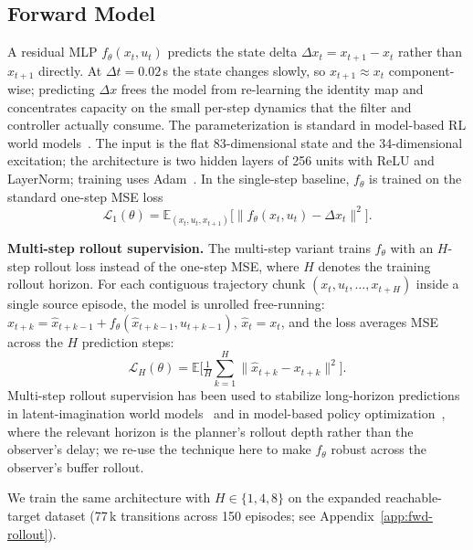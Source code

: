 \documentclass[sn-mathphys,NameDate,iicol]{sn-jnl}
\begin{document}
\subsection{Forward Model}
A residual MLP $f_\theta(x_t, u_t)$ predicts the state delta
$\Delta x_t {=} x_{t+1}-x_t$ rather than $x_{t+1}$ directly. At
$\Delta t{=}0.02$\,s the state changes slowly, so $x_{t+1}\!\approx\!x_t$
component-wise; predicting $\Delta x$ frees the model from re-learning
the identity map and concentrates capacity on the small per-step
dynamics that the filter and controller actually consume. The
parameterization is standard in model-based RL world
models~\cite{hafner2020dreamer,janner2019mbpo}. The input is the flat
83-dimensional state and the 34-dimensional excitation; the architecture is two hidden
layers of 256 units with ReLU and LayerNorm; training uses
Adam~\cite{kingma2015adam}.
In the single-step baseline, $f_\theta$ is trained on the standard
one-step MSE loss
\begin{equation}
\mathcal{L}_1(\theta) = \mathbb{E}_{(x_t,u_t,x_{t+1})}\big[\|f_\theta(x_t,u_t)
- \Delta x_t\|^2\big].
\label{eq:L_one_step}
\end{equation}

\noindent\textbf{Multi-step rollout supervision.} The multi-step
variant trains $f_\theta$ with an $H$-step rollout loss instead of
the one-step MSE, where $H$ denotes the training rollout horizon.
For each contiguous trajectory chunk
$(x_t,u_t,\dots,x_{t+H})$ inside a single source episode, the model
is unrolled free-running:
$\hat x_{t+k} = \hat x_{t+k-1} + f_\theta(\hat x_{t+k-1}, u_{t+k-1})$,
$\hat x_t = x_t$, and the loss averages MSE across the $H$
prediction steps:
\begin{equation}
\mathcal{L}_H(\theta) = \mathbb{E}\Big[\tfrac{1}{H}\sum_{k=1}^H\|\hat x_{t+k}
- x_{t+k}\|^2\Big].
\label{eq:L_H_step}
\end{equation}
Multi-step rollout supervision has been used to stabilize long-horizon
predictions in latent-imagination world models~\cite{hafner2020dreamer}
and in model-based policy optimization~\cite{janner2019mbpo}, where the
relevant horizon is the planner's rollout depth rather than the
observer's delay; we re-use the technique here to make $f_\theta$
robust across the observer's buffer rollout.

\noindent We train the same architecture with $H\!\in\!\{1,4,8\}$ on the
expanded reachable-target dataset
(77\,k transitions across 150 episodes; see
Appendix~\ref{app:fwd-rollout}).
\end{document}

